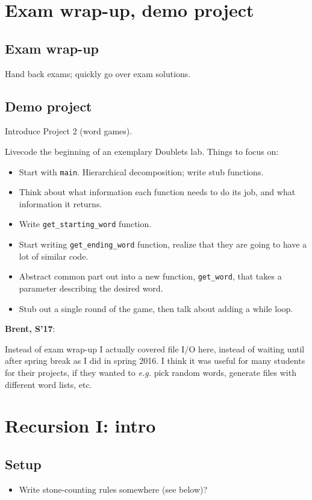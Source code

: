 \documentclass{article}
\newenvironment{reflect}[1]
{
  \noindent
  \begin{lrbox}{\reflectbox}
    \begin{minipage}[t]{\textwidth}
      \textbf{#1}:
}{
    \end{minipage}
  \end{lrbox}
  \fbox{\usebox{\reflectbox}}
}
\begin{document}
\section{Exam wrap-up, demo project}

\subsection*{Exam wrap-up}

Hand back exams; quickly go over exam solutions.

\subsection*{Demo project}

Introduce Project 2 (word games).

Livecode the beginning of an exemplary Doublets lab.  Things to focus
on:
\begin{itemize}
\item Start with \verb|main|.  Hierarchical decomposition; write stub
  functions.
\item Think about what information each function needs to do its job,
  and what information it returns.
\item Write \verb|get_starting_word| function.
\item Start writing \verb|get_ending_word| function, realize that they
  are going to have a lot of similar code.
\item Abstract common part out into a new function, \verb|get_word|,
  that takes a parameter describing the desired word.
\item Stub out a single round of the game, then talk about adding a
  while loop.
\end{itemize}

\begin{reflect}{Brent, S'17}
  Instead of exam wrap-up I actually covered file I/O here, instead of
  waiting until after spring break as I did in spring 2016. I think
  it was useful for many students for their projects, if they wanted
  to \emph{e.g.} pick random words, generate files with different word
  lists, etc.
\end{reflect}

\section{Recursion I: intro}

\subsection*{Setup}
\begin{itemize}
\item Write stone-counting rules somewhere (see below)?
\end{itemize}
\end{document}
